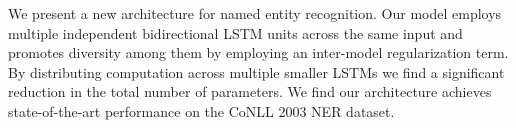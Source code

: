 We present a new architecture for named entity recognition. Our model employs multiple independent bidirectional LSTM units across the same input and promotes diversity among them by employing an inter-model regularization term. By distributing computation across multiple smaller LSTMs we find a significant reduction in the total number of parameters. We find our architecture achieves state-of-the-art performance on the CoNLL 2003 NER dataset.
